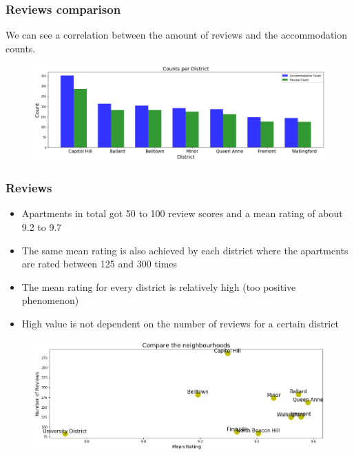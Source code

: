 \documentclass{beamer}
\begin{document}

\begin{frame}
\frametitle{Reviews comparison}
We can see a correlation between the amount of reviews and the accommodation counts. 
\begin{figure}
\includegraphics[width=0.8\linewidth]{photo/3_count_per_district}
\end{figure}
\end{frame}


\begin{frame}
\frametitle{Reviews}
\begin{itemize}
\item Apartments in total got 50 to 100 review scores and a mean rating of about 9.2 to 9.7 
\item The same mean rating is also achieved by each district where the apartments are rated between 125 and 300 times 
\item The mean rating for every district is relatively high (too positive phenomenon)
\item High value is not dependent on the number of reviews for a certain district
\end{itemize}
%
\begin{figure}
\includegraphics[width=0.8\linewidth]{photo/2_2_compare_the_neighbourhoods}
\end{figure}
\end{frame}

\end{document}
